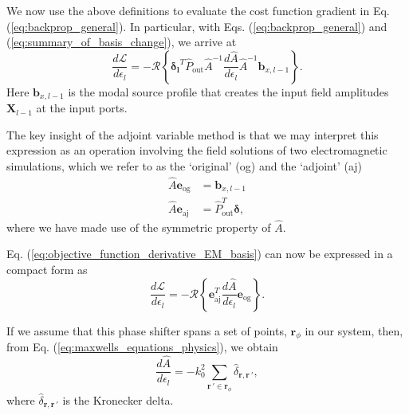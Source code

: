 %

We now use the above definitions to evaluate the cost function gradient in Eq. (\ref{eq:backprop_general}). In particular, with Eqs. (\ref{eq:backprop_general}) and (\ref{eq:summary_of_basis_change}), we arrive at 
\begin{equation}
\frac{d\mathcal{L}}{d\epsilon_l} = -\mathcal{R}\left\{\boldsymbol{\delta_l}^T \hat{P}_{\textrm{out}} \hat{A}^{-1} \frac{d\hat{A}}{d\epsilon_l} \hat{A}^{-1} \mathbf{b}_{x,l-1} \right\}.
\label{eq:objective_function_derivative_EM_basis}
\end{equation}
Here $\mathbf{b}_{x,l-1}$ is the modal source profile that creates the input field amplitudes $\mathbf{X}_{l-1}$ at the input ports. 

The key insight of the adjoint variable method is that we may interpret this expression as an operation involving the field solutions of two electromagnetic simulations, which we refer to as the `original' (og) and the `adjoint' (aj)
\begin{align}
\hat{A} \mathbf{e}_{\textrm{og}} &= \mathbf{b}_{x,l-1} \\
\hat{A} \mathbf{e}_{\textrm{aj}} &= \hat{P}_{\textrm{out}}^T \boldsymbol{\delta},
\label{eq:adjoint}
\end{align}
where we have made use of the symmetric property of $\hat{A}$. 

Eq. (\ref{eq:objective_function_derivative_EM_basis}) can now be expressed in a compact form as 
\begin{equation}
\frac{d\mathcal{L}}{d\epsilon_l} = -\mathcal{R}\left\{\mathbf{e}_{\textrm{aj}}^T\frac{d\hat{A}}{d\epsilon_l}\mathbf{e}_{\textrm{og}} \right\}.
\label{eq:objective_function_derivative_simple}
\end{equation}

If we assume that this phase shifter spans a set of points, $\mathbf{r}_\phi$ in our system, then, from Eq. (\ref{eq:maxwells_equations_physics}), we obtain
\begin{equation}
\frac{d\hat{A}}{d\epsilon_l} = -k_0^2 \sum_{{\mathbf{r}\,}' \in \mathbf{r}_\phi}\hat{\delta}_{\mathbf{r},{\mathbf{r}\,}'},
\label{eq:dAdphi}
\end{equation}
where $\hat{\delta}_{\mathbf{r},{\mathbf{r}\,}'}$ is the Kronecker delta.

